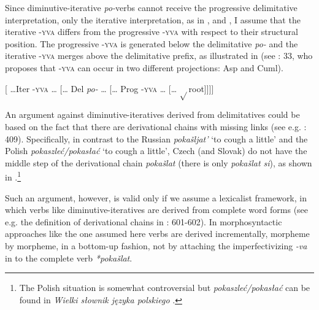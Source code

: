\documentclass[output=paper,colorlinks,citecolor=brown]{langscibook}
\begin{document}
Since diminutive-iterative \textit{po-}verbs cannot receive the progressive delimitative interpretation, only the iterative interpretation, as in ,  and , I assume that the iterative \textsc{-yva} differs from the progressive \textsc{-yva} with respect to their structural position. The progressive \textsc{-yva} is generated below the delimitative \textit{po-} and the iterative \textsc{-yva} merges above the delimitative prefix, as illustrated in  (see \citealt{bis:Ramchand2004}: 33, who proposes that \textsc{-yva} can occur in two different projections: Asp and Cuml). 

\ea\label{biskup:ex:root2} {[ \dots Iter \textsc{-yva} {\dots} [{\dots} Del \textit{po-} {\dots} [{\dots} Prog \textsc{-yva} {\dots} [{\dots} $\sqrt{}$root]]]]} \\
\z

\noindent An argument against diminutive-iteratives derived from delimitatives could be based on the fact that there are derivational chains with missing links (see e.g. \citealt{Souckova2004b}: 409). Specifically, in contrast to the Russian \textit{pokašljat'} ‘to cough a little’ and the Polish \textit{pokaszleć/pokasłać} ‘to cough a little’, Czech (and Slovak) do not have the middle step of the derivational chain \textit{pokašlat} (there is only \textit{pokašlat si}), as shown in .\footnote{The Polish situation is somewhat controversial but \textit{pokaszleć/pokasłać} can be found in \textit{Wielki słownik języka polskiego} \citep{Żmigrodzki2022}.}

\ea\label{biskup:ex:cough}
\z\z

\noindent Such an argument, however, is valid only if we assume a lexicalist framework, in which verbs like diminutive-iteratives are derived from complete word forms (see e.g. the definition of derivational chains in \citealt{Zinova.Filip2015}: 601-602). In morphosyntactic approaches like the one assumed here verbs are derived incrementally, morpheme by morpheme, in a bottom-up fashion, not by attaching the imperfectivizing \textit{-va} in  to the complete verb \textit{*pokašlat}.
\end{document}
